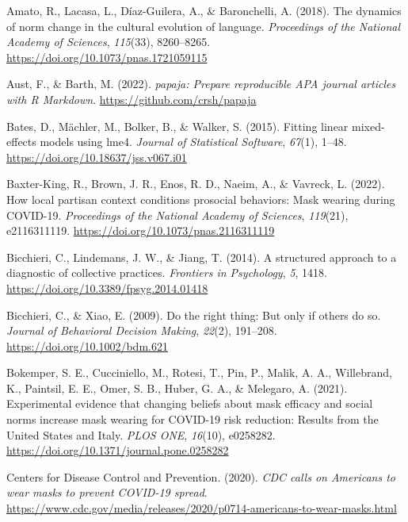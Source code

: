 \documentclass[
  man, donotrepeattitle,mask,floatsintext]{apa6}
\newlength{\cslhangindent}
\newlength{\cslentryspacingunit} %
\newenvironment{CSLReferences}[2] %
 {%
  \setlength{\parindent}{0pt}
  \ifodd #1
  \let\oldpar\par
  \def\par{\hangindent=\cslhangindent\oldpar}
  \fi
  \setlength{\parskip}{#2\cslentryspacingunit}
 }%
 {}
\begin{document}
\hypertarget{refs}{}
\begin{CSLReferences}{1}{0}
\leavevmode{}%
Amato, R., Lacasa, L., Díaz-Guilera, A., \& Baronchelli, A. (2018). The dynamics of norm change in the cultural evolution of language. \emph{Proceedings of the National Academy of Sciences}, \emph{115}(33), 8260--8265. \url{https://doi.org/10.1073/pnas.1721059115}

\leavevmode{}%
Aust, F., \& Barth, M. (2022). \emph{{papaja}: {Prepare} reproducible {APA} journal articles with {R Markdown}}. \url{https://github.com/crsh/papaja}

\leavevmode{}%
Bates, D., Mächler, M., Bolker, B., \& Walker, S. (2015). Fitting linear mixed-effects models using lme4. \emph{Journal of Statistical Software}, \emph{67}(1), 1--48. \url{https://doi.org/10.18637/jss.v067.i01}

\leavevmode{}%
Baxter-King, R., Brown, J. R., Enos, R. D., Naeim, A., \& Vavreck, L. (2022). How local partisan context conditions prosocial behaviors: Mask wearing during {COVID-19}. \emph{Proceedings of the National Academy of Sciences}, \emph{119}(21), e2116311119. \url{https://doi.org/10.1073/pnas.2116311119}

\leavevmode{}%
Bicchieri, C., Lindemans, J. W., \& Jiang, T. (2014). A structured approach to a diagnostic of collective practices. \emph{Frontiers in Psychology}, \emph{5}, 1418. \url{https://doi.org/10.3389/fpsyg.2014.01418}

\leavevmode{}%
Bicchieri, C., \& Xiao, E. (2009). Do the right thing: But only if others do so. \emph{Journal of Behavioral Decision Making}, \emph{22}(2), 191--208. \url{https://doi.org/10.1002/bdm.621}

\leavevmode{}%
Bokemper, S. E., Cucciniello, M., Rotesi, T., Pin, P., Malik, A. A., Willebrand, K., Paintsil, E. E., Omer, S. B., Huber, G. A., \& Melegaro, A. (2021). Experimental evidence that changing beliefs about mask efficacy and social norms increase mask wearing for {COVID-19} risk reduction: Results from the {United States} and {Italy}. \emph{PLOS ONE}, \emph{16}(10), e0258282. \url{https://doi.org/10.1371/journal.pone.0258282}

\leavevmode{}%
Centers for Disease Control and Prevention. (2020). \emph{{CDC calls on Americans to wear masks to prevent COVID-19 spread}}. \url{https://www.cdc.gov/media/releases/2020/p0714-americans-to-wear-masks.html}


\end{CSLReferences}
\end{document}
